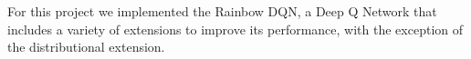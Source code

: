 
For this project we implemented the Rainbow DQN\cite{Hessel2018RainbowCI}, a Deep Q Network that includes a variety of extensions to improve its performance, with the exception of the distributional extension.

